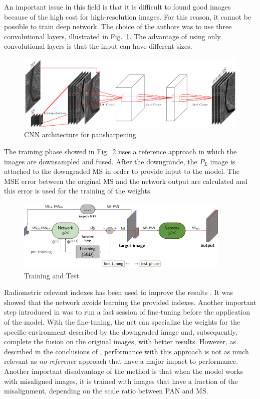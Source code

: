 \documentclass[12pt]{report}
\begin{document}
An important issue in this field is that it is difficult to found good images because of the high cost for high-resolution images.
For this reason, it cannot be possible to train deep network. The choice of the authors was to use three convolutional layers, illustrated in Fig.~\ref{fig:dl-pnn}.
The advantage of using only convolutional layers is that the input can have different sizes.

\begin{figure}[t]
    \centering
    \includegraphics[scale=.8]{dl-pnn.png}
    \caption{CNN architecture for pansharpening\cite{pnn}}
    \label{fig:dl-pnn}
\end{figure}

The training phase showed in Fig.~\ref{fig:pnn-training} uses a reference approach in which the images are downsampled and fused. 
After the downgrande, the $P_L$ image is attached to the downgraded MS in order to provide input to the model.
The MSE error between the original MS and the network output are calculated and this error is used for the training of the weights.

\begin{figure}[t]
    \centering
    \includegraphics[scale=.9]{pnn-training.png}
    \caption{Training and Test\cite{pnn2}}
    \label{fig:pnn-training}
\end{figure}

Radiometric relevant indexes has been used to improve the results \cite{pnn}. 
It was showed that the network avoids learning the provided indexes.
Another important step introduced in \cite{pnn2} was to run a fast session of fine-tuning before the 
application of the model.
With the fine-tuning, the net can specialize the weights for the specific environment described by the downgraded image
and, subsequently, complete the fusion on the original images, with better results.
However, as described in the conclusions of \cite{pnn2}, performance with this approach is
not as much relevant as \textit{no-reference} approach that have a major impact to performance.
Another important disadvantage of the method is that when the model works with misaligned images, 
it is trained with images that have a fraction of the misalignment, depending on the scale ratio between PAN and MS. 
\end{document}
